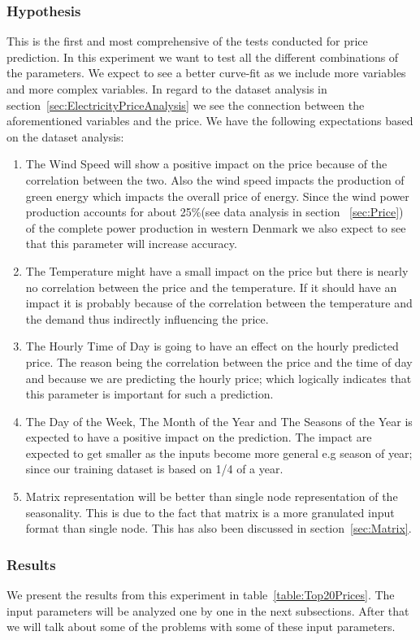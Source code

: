 \subsubsection{Hypothesis}
This is the first and most comprehensive of the tests conducted for price prediction. In this experiment we want to test all the different combinations of the parameters. We expect to see a better curve-fit as we include more variables and more complex variables. In regard to the dataset analysis in section~\ref{sec:ElectricityPriceAnalysis} we see the connection between the aforementioned variables and the price. We have the following expectations based on the dataset analysis:
\begin{enumerate}
	\item The Wind Speed will show a positive impact on the price because of the correlation between the two. Also the wind speed impacts the production of green energy which impacts the overall price of energy. Since the wind power production accounts for about 25\%(see data analysis in section ~\ref{sec:Price}) of the complete power production in western Denmark we also expect to see that this parameter will increase accuracy.
	\item The Temperature might have a small impact on the price but there is nearly no correlation between the price and the temperature. If it should have an impact it is probably because of the correlation between the temperature and the demand thus indirectly influencing the price.
	\item The Hourly Time of Day is going to have an effect on the hourly predicted price. The reason being the correlation between the price and the time of day and because we are predicting the hourly price; which logically indicates that this parameter is important for such a prediction. 
	\item The Day of the Week, The Month of the Year and The Seasons of the Year is expected to have a positive impact on the prediction. The impact are expected to get smaller as the inputs become more general e.g season of year; since our training dataset is based on 1/4 of a year. 
	\item Matrix representation will be better than single node representation of the seasonality. This is due to the fact that matrix is a more granulated input format than single node. This has also been discussed in section~\ref{sec:Matrix}.
\end{enumerate}

\subsubsection{Results}
We present the results from this experiment in table~\ref{table:Top20Prices}. The input parameters will be analyzed one by one in the next subsections. After that we will talk about some of the problems with some of these input parameters.


